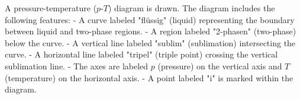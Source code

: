 A pressure-temperature (\(p\)-\(T\)) diagram is drawn. The diagram includes the following features:  
- A curve labeled "flüssig" (liquid) representing the boundary between liquid and two-phase regions.  
- A region labeled "2-phasen" (two-phase) below the curve.  
- A vertical line labeled "sublim" (sublimation) intersecting the curve.  
- A horizontal line labeled "tripel" (triple point) crossing the vertical sublimation line.  
- The axes are labeled \(p\) (pressure) on the vertical axis and \(T\) (temperature) on the horizontal axis.  
- A point labeled "i" is marked within the diagram.